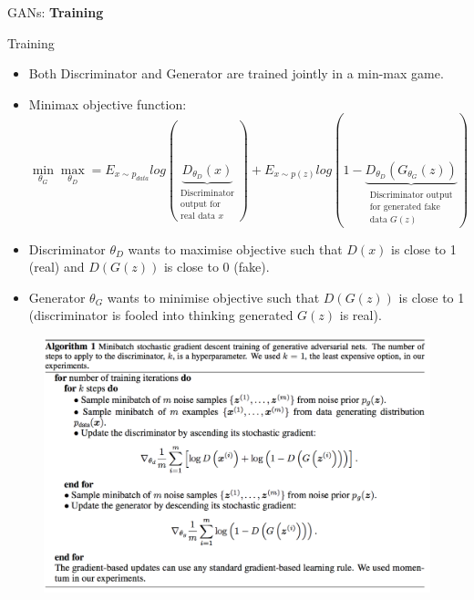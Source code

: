 \begin{frame}{}
    \LARGE GANs: \textbf{Training}
\end{frame}

\begin{frame}[allowframebreaks]{Training}
\begin{itemize}
    \item Both Discriminator and Generator are trained jointly in a min-max game.
    \item Minimax objective function:
    $$\min_{\theta_G} \max_{\theta_D} = E_{x \sim p_{data}} log(\underbrace{D_{\theta_D}(x)}_{\substack{\text{Discriminator}\\ \text{output for}\\ \text{real data }x}}) + E_{x \sim p(z)} log(1-\underbrace{D_{\theta_D}(G_{\theta_G}(z))}_{\substack{\text{Discriminator output}\\ \text{for generated fake}\\ \text{data } G(z)}})$$
    \item Discriminator $\theta_D$ wants to maximise objective such that $D(x)$ is close to 1 (real) and $D(G(z))$ is close to 0 (fake).
    \item Generator $\theta_G$ wants to minimise objective such that $D(G(z))$ is close to 1 (discriminator is fooled into thinking generated $G(z)$ is real).

\end{itemize}

\framebreak
\begin{figure}
    \centering
    \includegraphics[height=1\textheight, width=1.02\textwidth, keepaspectratio]{images/gan/pseudocode.png}
\end{figure}


\end{frame}
